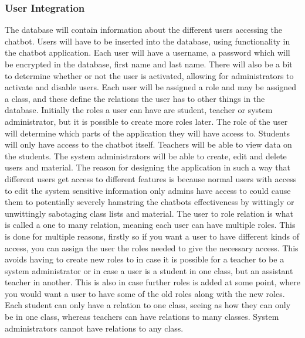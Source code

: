 \subsubsection{User Integration}

The database will contain information about the different users accessing the chatbot. Users will have to be inserted into the database, using functionality in the chatbot application. Each user will have a username, a password which will be encrypted in the database, first name and last name. There will also be a bit to determine whether or not the user is activated, allowing for administrators to activate and disable users. Each user will be assigned a role and may be assigned a class, and these define the relations the user has to other things in the database. Initially the roles a user can have are student, teacher or system administrator, but it is possible to create more roles later. The role of the user will determine which parts of the application they will have access to. Students will only have access to the chatbot itself. Teachers will be able to view data on the students. The system administrators will be able to create, edit and delete users and material. 
\newline\newline
The reason for designing the application in such a way that different users get access to different features is because normal users with access to edit the system sensitive information only admins have access to could cause them to potentially severely hamstring the chatbots effectiveness by wittingly or unwittingly sabotaging class lists and material. The user to role relation is what is called a one to many relation, meaning each user can have multiple roles. This is done for multiple reasons, firstly so if you want a user to have different kinds of access, you can assign the user the roles needed to give the necessary access. This avoids having to create new roles to in case  it is possible for a teacher to be a system administrator or in case a user is a student in one class, but an assistant teacher in another. This is also in case further roles is added at some point, where you would want a user to have some of the old roles along with the new roles. Each student can only have a relation to one class, seeing as how they can only be in one class, whereas teachers can have relations to many classes. System administrators cannot have relations to any class. 